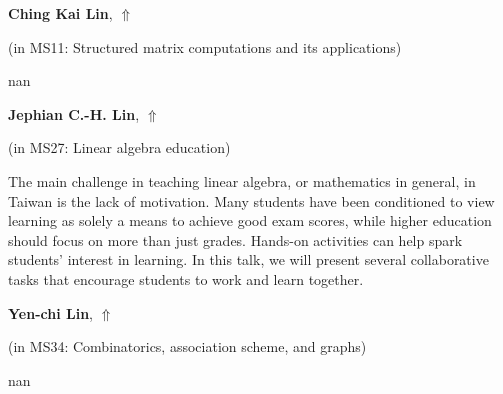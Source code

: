 \documentclass[ILAS2025-program.tex]{subfiles}
\begin{document}
\hypertarget{down0236}{}\begin{ilasabstract}
    
\textbf{Ching Kai Lin},  \hfill \hyperlink{up0236}{$\Uparrow$}
    
    
(in {\color{mstitle}MS11: Structured matrix computations and its applications})
        
\mtskip
    nan
\end{ilasabstract}
    

\hypertarget{down0261}{}\begin{ilasabstract}
    
\textbf{Jephian C.-H. Lin},  \hfill \hyperlink{up0261}{$\Uparrow$}
    
    
(in {\color{mstitle}MS27: Linear algebra education})
        
\mtskip
    The main challenge in teaching linear algebra, or mathematics in general, in Taiwan is the lack of motivation. Many students have been conditioned to view learning as solely a means to achieve good exam scores, while higher education should focus on more than just grades. Hands-on activities can help spark students' interest in learning. In this talk, we will present several collaborative tasks that encourage students to work and learn together.

\end{ilasabstract}
    

\hypertarget{down0324}{}\begin{ilasabstract}
    
\textbf{Yen-chi Lin},  \hfill \hyperlink{up0324}{$\Uparrow$}
    
    
(in {\color{mstitle}MS34: Combinatorics, association scheme, and graphs})
        
\mtskip
    nan
\end{ilasabstract}
    
\end{document}
